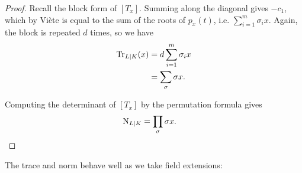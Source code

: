 \begin{proof}
	Recall the block form of $[T_x]$. Summing along the diagonal gives $-c_1$, which by Viète is equal to the sum of the roots of $p_x(t)$, i.e. $\sum_{i=1}^m \sigma_i x$. Again, the block is repeated $d$ times, so we have
	\begin{align*}
		\operatorname{Tr}_{L\mid K}(x) &= d \sum_{i=1}^m \sigma_i x\\
			&= \sum_\sigma \sigma x.
	\end{align*}

	Computing the determinant of $[T_x]$ by the permutation formula gives
	\begin{align*}
		\operatorname{N}_{L\mid K} &= \prod_\sigma \sigma x.
	\end{align*}

\end{proof}

The trace and norm behave well as we take field extensions:

